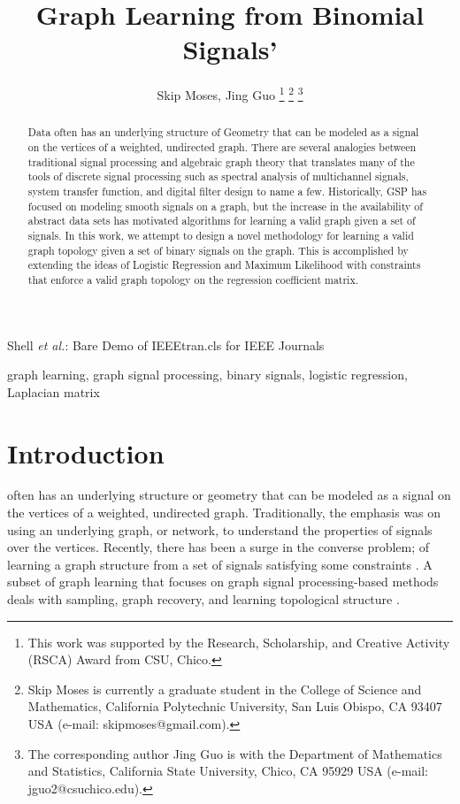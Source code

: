 \documentclass[journal]{IEEEtran}
\theoremstyle{definition}
\theoremstyle{remark}
\begin{document}
\title{Graph Learning from Binomial Signals'}
\author{Skip Moses, Jing Guo
\thanks{This work was supported by the  Research, Scholarship, and Creative Activity (RSCA) Award from CSU, Chico. }
\thanks{Skip Moses is currently a graduate student in the College of Science and Mathematics, California Polytechnic University, San Luis Obispo, CA 93407 USA (e-mail: skipmoses@gmail.com).}
\thanks{The corresponding author Jing Guo is with the Department of Mathematics and Statistics, California State University, Chico, CA 95929 USA (e-mail: jguo2@csuchico.edu).}}

{Shell \MakeLowercase{\textit{et al.}}: Bare Demo of IEEEtran.cls for IEEE Journals}
\maketitle

\begin{abstract}
Data often has an underlying structure of Geometry that can be modeled as a signal on the vertices of a weighted, undirected graph. There are several analogies between traditional signal processing and algebraic graph theory that translates many of the tools of discrete signal processing such as spectral analysis of multichannel signals, system transfer function, and digital filter design to name a few. Historically, GSP has focused on modeling smooth signals on a graph, but the increase in the availability of abstract data sets has motivated algorithms for learning a valid graph given a set of signals. In this work, we attempt to design a novel methodology for learning a valid graph topology given a set of binary signals on the graph. This is accomplished by extending the ideas of  Logistic Regression and Maximum Likelihood with constraints that enforce a valid graph topology on the regression coefficient matrix. 
\end{abstract}

\begin{IEEEkeywords}
graph learning, graph signal processing, binary signals, logistic regression, Laplacian matrix
\end{IEEEkeywords}

\section{Introduction}

 often has an underlying structure or geometry that can be modeled as a signal on the vertices of a weighted, undirected graph. Traditionally, the emphasis was on using an underlying graph, or network, to understand the properties of signals over the vertices. Recently, there has been a surge in the converse problem; of learning a graph structure from a set of signals satisfying some constraints \cite{xia2021graph} \cite{stankovic2019vertex} \cite{ortega2018graph}. A subset of graph learning that focuses on graph signal processing-based methods deals with sampling, graph recovery, and learning topological structure \cite{xia2021graph}. 
\end{document}
